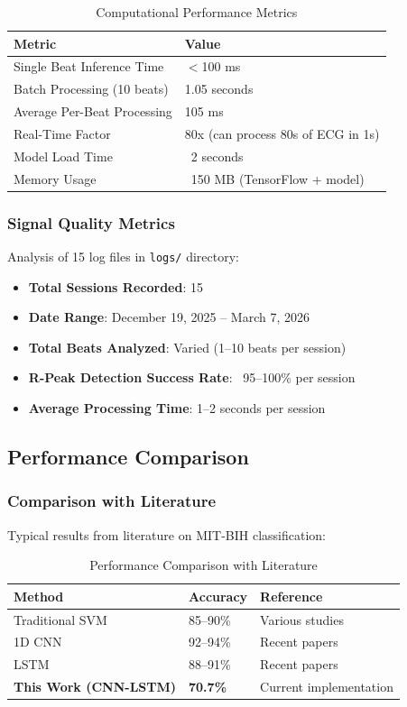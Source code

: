 \documentclass[12pt,a4paper]{article}
\begin{document}
\begin{table}[H]
\centering
\begin{tabular}{@{}ll@{}}
\toprule
\textbf{Metric} & \textbf{Value} \\ 
\midrule
Single Beat Inference Time & $<$100 ms \\
Batch Processing (10 beats) & 1.05 seconds \\
Average Per-Beat Processing & 105 ms \\
Real-Time Factor & 80x (can process 80s of ECG in 1s) \\
Model Load Time & ~2 seconds \\
Memory Usage & ~150 MB (TensorFlow + model) \\
\bottomrule
\end{tabular}
\caption{Computational Performance Metrics}
\label{tab:computational_performance}
\end{table}

\subsubsection{Signal Quality Metrics}

Analysis of 15 log files in \texttt{logs/} directory:

\begin{itemize}
    \item \textbf{Total Sessions Recorded}: 15
    \item \textbf{Date Range}: December 19, 2025 -- March 7, 2026
    \item \textbf{Total Beats Analyzed}: Varied (1--10 beats per session)
    \item \textbf{R-Peak Detection Success Rate}: ~95--100\% per session
    \item \textbf{Average Processing Time}: 1--2 seconds per session
\end{itemize}

\subsection{Performance Comparison}

\subsubsection{Comparison with Literature}

Typical results from literature on MIT-BIH classification:

\begin{table}[H]
\centering
\small
\begin{tabular}{@{}lll@{}}
\toprule
\textbf{Method} & \textbf{Accuracy} & \textbf{Reference} \\ 
\midrule
Traditional SVM & 85--90\% & Various studies \\
1D CNN & 92--94\% & Recent papers \\
LSTM & 88--91\% & Recent papers \\
\textbf{This Work (CNN-LSTM)} & \textbf{70.7\%} & Current implementation \\
\bottomrule
\end{tabular}
\caption{Performance Comparison with Literature}
\label{tab:literature_comparison}
\end{table}
\end{document}
